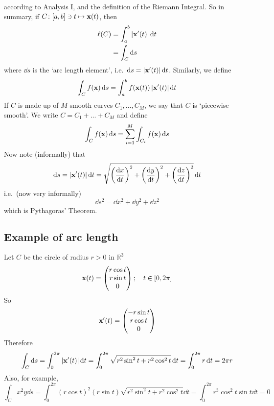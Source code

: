 according to Analysis I, and the definition of the Riemann Integral.
So in summary, if \(C \colon [a, b] \ni t \mapsto \vb x(t)\), then
\begin{align*}
	\ell(C) & = \int_a^b \abs{\vb x'(t)} \dd{t} \\
	        & = \int_C \dd{s}
\end{align*}
where \(\dd{s}\) is the `arc length element', i.e.\ \(\dd{s} = \abs{\vb x'(t)} \dd{t}\).
Similarly, we define
\[
	\int_C f(\vb x) \dd{s} = \int_a^b f(\vb x(t)) \,\abs{\vb x'(t)} \dd{t}
\]
If \(C\) is made up of \(M\) smooth curves \(C_1, \dots, C_M\), we say that \(C\) is `piecewise smooth'.
We write \(C = C_1 + \dots + C_M\) and define
\[
	\int_C f(\vb x) \dd{s} = \sum_{i=1}^M \int_{C_i}f(\vb x) \dd{s}
\]
Now note (informally) that
\[
	\dd{s} = \abs{\vb x'(t)}\dd{t} = \sqrt{\left( \frac{\dd{x}}{\dd{t}} \right)^2 + \left( \frac{\dd{y}}{\dd{t}} \right)^2 + \left( \frac{\dd{z}}{\dd{t}} \right)^2} \dd{t}
\]
i.e.\ (now very informally)
\[
	\dd{s}^2 = \dd{x}^2 + \dd{y}^2 + \dd{z}^2
\]
which is Pythagoras' Theorem.

\subsection{Example of arc length}
Let \(C\) be the circle of radius \(r>0\) in \(\mathbb R^3\)
\[
	\vb x(t) = \begin{pmatrix}
		r\cos t \\ r\sin t \\ 0
	\end{pmatrix};\quad t \in [0, 2\pi]
\]
So
\[
	\vb x'(t) = \begin{pmatrix}
		-r\sin t \\ r\cos t \\ 0
	\end{pmatrix}
\]
Therefore
\[
	\int_C \dd{s} = \int_0^{2\pi} \abs{\vb x'(t)} \dd{t} = \int_0^{2\pi} \sqrt{r^2 \sin^2 t + r^2 \cos^2 t} \dd{t} = \int_0^{2\pi} r \dd{t} = 2\pi r
\]
Also, for example,
\[
	\int_C x^2 y \dd{s} = \int_0^{2\pi} (r \cos t)^2 (r \sin t) \sqrt{r^2 \sin^2 t + r^2 \cos^2 t} \dd{t} = \int_0^{2\pi} r^3 \cos^2 t \sin t \dd{t} = 0
\]

